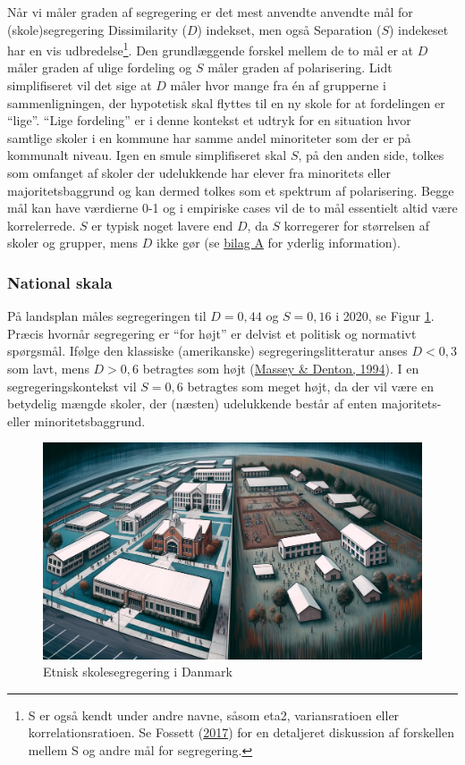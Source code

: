 \documentclass[
]{book}
\begin{document}
Når vi måler graden af segregering er det mest anvendte anvendte mål for (skole)segregering Dissimilarity (\(D\)) indekset, men også Separation (\(S\)) indekeset har en vis udbredelse\footnote{S er også kendt under andre navne, såsom eta2, variansratioen eller korrelationsratioen. Se Fossett (\protect\hyperlink{ref-fossett2017}{2017}) for en detaljeret diskussion af forskellen mellem S og andre mål for segregering.}. Den grundlæggende forskel mellem de to mål er at \(D\) måler graden af ulige fordeling og \(S\) måler graden af polarisering. Lidt simplifiseret vil det sige at \(D\) måler hvor mange fra én af grupperne i sammenligningen, der hypotetisk skal flyttes til en ny skole for at fordelingen er ``lige''. ``Lige fordeling'' er i denne kontekst et udtryk for en situation hvor samtlige skoler i en kommune har samme andel minoriteter som der er på kommunalt niveau. Igen en smule simplifiseret skal \(S\), på den anden side, tolkes som omfanget af skoler der udelukkende har elever fra minoritets eller majoritetsbaggrund og kan dermed tolkes som et spektrum af polarisering. Begge mål kan have værdierne 0-1 og i empiriske cases vil de to mål essentielt altid være korrelerrede. \(S\) er typisk noget lavere end \(D\), da \(S\) korregerer for størrelsen af skoler og grupper, mens \(D\) ikke gør (se \protect\hyperlink{bilag1}{bilag A} for yderlig information).

\hypertarget{national-skala}{%
\subsubsection{National skala}\label{national-skala}}

På landsplan måles segregeringen til \(D = 0,44\) og \(S = 0,16\) i 2020, se Figur \ref{fig:fig-3-2}. Præcis hvornår segregering er ``for højt'' er delvist et politisk og normativt spørgsmål. Ifølge den klassiske (amerikanske) segregeringslitteratur anses \(D < 0,3\) som lavt, mens \(D > 0,6\) betragtes som højt (\protect\hyperlink{ref-massey1994}{Massey \& Denton, 1994}). I en segregeringskontekst vil \(S=0,6\) betragtes som meget højt, da der vil være en betydelig mængde skoler, der (næsten) udelukkende består af enten majoritets- eller minoritetsbaggrund.

\begin{figure}
\includegraphics[width=24.89in]{images/dalle-schoolseg} \caption{Etnisk skolesegregering i Danmark}\label{fig:fig-3-2}
\end{figure}
\end{document}

